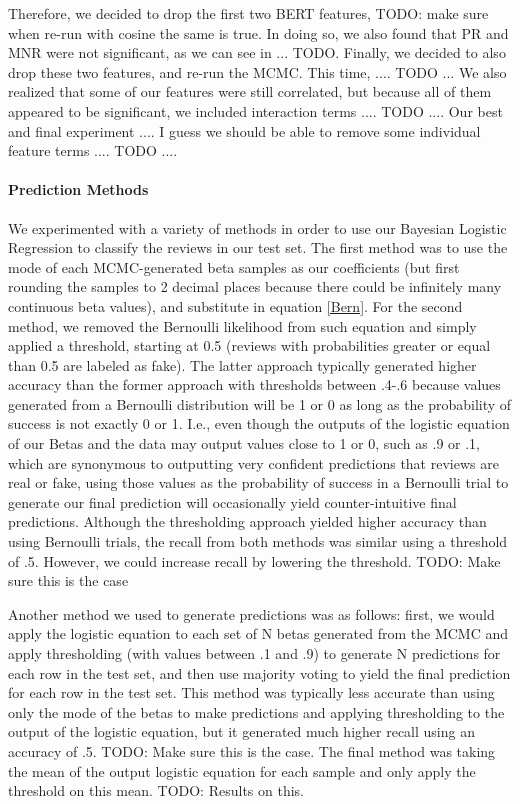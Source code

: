 \documentclass[man, floatsintext, 10pt]{apa6}
\begin{document}
Therefore, we decided to drop the first two BERT features, TODO: make sure when re-run with cosine the same is true. In doing so, we also found that PR and MNR were not significant, as we can see in ... TODO. Finally, we decided to also drop these two features, and re-run the MCMC. This time, .... TODO ...   We also realized that some of our features were still correlated, but because all of them appeared to be significant, we included interaction terms .... TODO .... Our best and final experiment .... I guess we should be able to remove some individual feature terms .... TODO ....

\vspace{2mm}

\paragraph{Prediction Methods} We experimented with a variety of methods in order to use our Bayesian Logistic Regression to classify the reviews in our test set. The first method was to use the mode of each MCMC-generated beta samples as our coefficients (but first rounding the samples to 2 decimal places because there could be infinitely many continuous beta values), and substitute in equation \ref{Bern}. For the second method, we removed the Bernoulli likelihood from such equation and simply applied a threshold, starting at 0.5 (reviews with probabilities greater or equal than 0.5 are labeled as fake). The latter approach typically generated higher accuracy than the former approach with thresholds between .4-.6 because values generated from a Bernoulli distribution will be 1 or 0 as long as the probability of success is not exactly 0 or 1. I.e., even though the outputs of the logistic equation of our Betas and the data may output values close to 1 or 0, such as .9 or .1, which are synonymous to outputting very confident predictions that reviews are real or fake, using those values as the probability of success in a Bernoulli trial to generate our final prediction will occasionally yield counter-intuitive final predictions. Although the thresholding approach yielded higher accuracy than using Bernoulli trials, the recall from both methods was similar using a threshold of .5. However, we could increase recall by lowering the threshold. TODO: Make sure this is the case

Another method we used to generate predictions was as follows: first, we would apply the logistic equation to each set of N betas generated from the MCMC and apply thresholding (with values between .1 and .9) to generate N predictions for each row in the test set, and then use majority voting to yield the final prediction for each row in the test set. This method was typically less accurate than using only the mode of the betas to make predictions and applying thresholding to the output of the logistic equation, but it generated much higher recall using an accuracy of .5. TODO: Make sure this is the case. The final method was taking the mean of the output logistic equation for each sample and only apply the threshold on this mean. TODO: Results on this.
\end{document}
